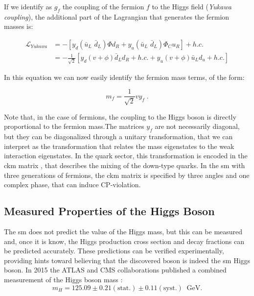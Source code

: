 \noindent If we identify as $g_f$ the coupling of the fermion $f$ to the Higgs field (\textit{Yukawa coupling}), the additional part of the Lagrangian that generates the fermion masses is:

\begin{equation}
\begin{aligned}
\mathcal{L}_{Yukawa} &= - \left[  y_d \left( \bar{u}_L \,\, \bar{d}_L  \right) \Phi d_R +  y_u \left( \bar{u}_L \,\, \bar{d}_L  \right) \Phi_C u_R \right] + h.c. \\
&= - \frac{1}{\sqrt{2}} \left[  y_d \left( v + \phi \right) \bar{d}_L d_R + h.c. + y_u \left( v + \phi \right) \bar{u}_L d_u + h.c. \right] 
\end{aligned}
\end{equation}

\noindent In this equation we can now easily identify the fermion mass terms, of the form:

\begin{equation}
m_f =  \frac{1}{\sqrt{2}} v y_f \; .
\end{equation}

\noindent Note that, in the case of fermions, the coupling to the Higgs boson is directly proportional to the fermion mass.The matrices $y_f$ are not necessarily diagonal, but they can be diagonalized through a unitary transformation, that we can interpret as the transformation that relates the mass eigenstates to the weak interaction eigenstates. In the quark sector, this transformation is encoded in the \gls{ckm} matrix \cite{Cabibbo:1963yz, Kobayashi:1973fv}, that describes the mixing of the down-type quarks. In the \gls{sm} with three generations of fermions, the \gls{ckm} matrix is specified by three angles and one complex phase, that can induce CP-violation.

\subsection{Measured Properties of the Higgs Boson}

The \gls{sm} does not predict the value of the Higgs mass, but this can be measured and, once it is know, the Higgs production cross section and decay fractions can be predicted accurately. These predictions can be verified experimentally, providing hints toward believing that the discovered boson is indeed the \gls{sm} Higgs boson. In 2015 the ATLAS and CMS collaborations published a combined measurement of the Higgs boson mass \cite{Aad:2015zhl}:
\begin{equation}
m_H = 125.09 \pm 0.21 (\mathrm{stat.}) \pm 0.11 (\mathrm{syst.}) \;\; \mathrm{GeV}.
\end{equation}

